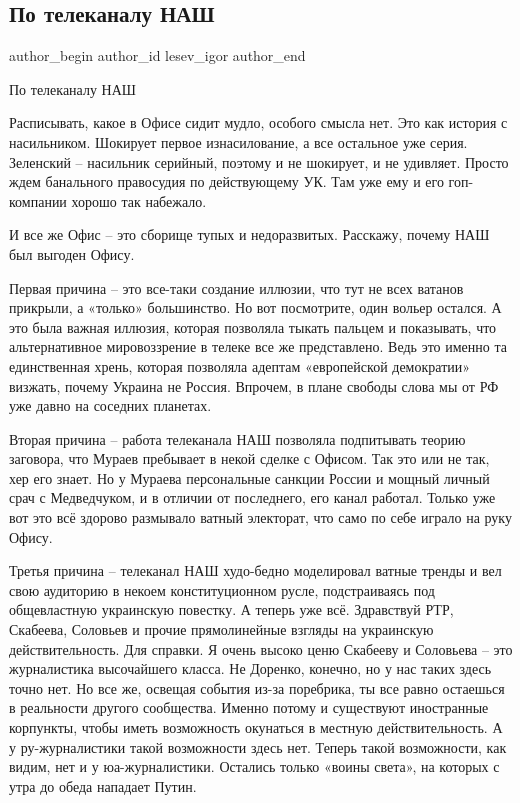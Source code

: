  
 
 
 
 
 
\subsection{По телеканалу НАШ}
\label{sec:12_02_2022.tg.lesev_igor.1.po_telekanalu_nash}
 
\ifcmt
 author_begin
   author_id lesev_igor
 author_end
\fi

По телеканалу НАШ

Расписывать, какое в Офисе сидит мудло, особого смысла нет. Это как история с
насильником. Шокирует первое изнасилование, а все остальное уже серия.
Зеленский – насильник серийный, поэтому и не шокирует, и не удивляет. Просто
ждем банального правосудия по действующему УК. Там уже ему и его гоп-компании
хорошо так набежало.

И все же Офис – это сборище тупых и недоразвитых. Расскажу, почему НАШ был
выгоден Офису.

Первая причина – это все-таки создание иллюзии, что тут не всех ватанов
прикрыли, а «только» большинство. Но вот посмотрите, один вольер остался. А это
была важная иллюзия, которая позволяла тыкать пальцем и показывать, что
альтернативное мировоззрение в телеке все же представлено. Ведь это именно та
единственная хрень, которая позволяла адептам «европейской демократии» визжать,
почему Украина не Россия. Впрочем, в плане свободы слова мы от РФ уже давно на
соседних планетах.

Вторая причина – работа телеканала НАШ позволяла подпитывать теорию заговора,
что Мураев пребывает в некой сделке с Офисом. Так это или не так, хер его
знает. Но у Мураева персональные санкции России и мощный личный срач с
Медведчуком, и в отличии от последнего, его канал работал. Только уже вот это
всё здорово размывало ватный электорат, что само по себе играло на руку Офису.

Третья причина – телеканал НАШ худо-бедно моделировал ватные тренды и вел свою
аудиторию в некоем конституционном русле, подстраиваясь под общевластную
украинскую повестку. А теперь уже всё. Здравствуй РТР, Скабеева, Соловьев и
прочие прямолинейные взгляды на украинскую действительность. Для справки. Я
очень высоко ценю Скабееву и Соловьева – это журналистика высочайшего класса.
Не Доренко, конечно, но у нас таких здесь точно нет. Но все же, освещая события
из-за поребрика, ты все равно остаешься в реальности другого сообщества. Именно
потому и существуют иностранные корпункты, чтобы иметь возможность окунаться в
местную действительность. А у ру-журналистики такой возможности здесь нет.
Теперь такой возможности, как видим, нет и у юа-журналистики. Остались только
«воины света», на которых с утра до обеда нападает Путин.

